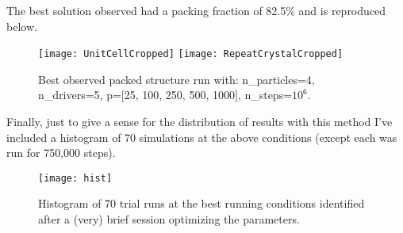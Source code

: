 \documentclass[12pt,a4paper]{article}
\begin{document}
The best solution observed had a packing fraction of 82.5\% and is reproduced below.

\begin{figure}[h!]
\begin{center}
	\texttt{[image: UnitCellCropped]}
	\texttt{[image: RepeatCrystalCropped]}
\end{center}
\caption{Best observed packed structure run with: n{\_}particles=4, n{\_}drivers=5, p=$[$25, 100, 250, 500, 1000$]$, n{\_}steps=$10^6$.}
\end{figure}

Finally, just to give a sense for the distribution of results with this method I've included a histogram of 70 simulations at the above conditions (except each was run for 750,000 steps). 

\begin{figure}[h!]
\begin{center}
	\texttt{[image: hist]}
\end{center}
\caption{Histogram of 70 trial runs at the best running conditions identified after a (very) brief session optimizing the parameters.}
\end{figure}
\end{document}
